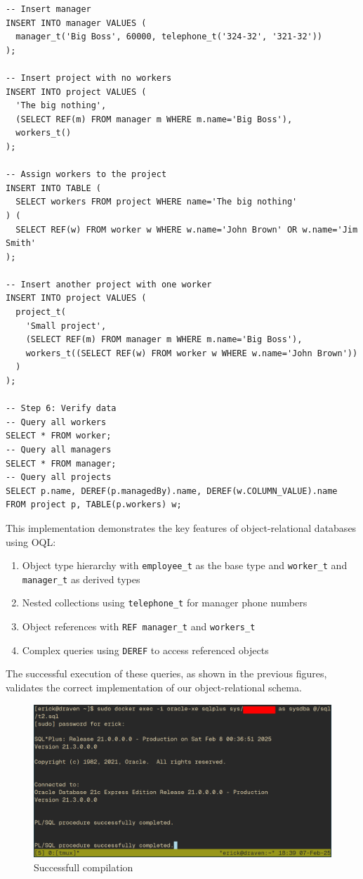\documentclass{article}
\begin{document}
\begin{verbatim}
-- Insert manager
INSERT INTO manager VALUES (
  manager_t('Big Boss', 60000, telephone_t('324-32', '321-32'))
);

-- Insert project with no workers
INSERT INTO project VALUES (
  'The big nothing',
  (SELECT REF(m) FROM manager m WHERE m.name='Big Boss'),
  workers_t()
);

-- Assign workers to the project
INSERT INTO TABLE (
  SELECT workers FROM project WHERE name='The big nothing'
) (
  SELECT REF(w) FROM worker w WHERE w.name='John Brown' OR w.name='Jim Smith'
);

-- Insert another project with one worker
INSERT INTO project VALUES (
  project_t(
    'Small project',
    (SELECT REF(m) FROM manager m WHERE m.name='Big Boss'),
    workers_t((SELECT REF(w) FROM worker w WHERE w.name='John Brown'))
  )
);

-- Step 6: Verify data
-- Query all workers
SELECT * FROM worker;
-- Query all managers
SELECT * FROM manager;
-- Query all projects
SELECT p.name, DEREF(p.managedBy).name, DEREF(w.COLUMN_VALUE).name
FROM project p, TABLE(p.workers) w;
\end{verbatim}

This implementation demonstrates the key features of object-relational databases using OQL:

\begin{enumerate}
    \item Object type hierarchy with \texttt{employee\_t} as the base type and \texttt{worker\_t} and \texttt{manager\_t} as derived types
    \item Nested collections using \texttt{telephone\_t} for manager phone numbers
    \item Object references with \texttt{REF manager\_t} and \texttt{workers\_t}
    \item Complex queries using \texttt{DEREF} to access referenced objects
\end{enumerate}

The successful execution of these queries, as shown in the previous figures, validates the correct implementation of our object-relational schema.

\begin{figure}[H]
	\centering
	\includegraphics[width=1\textwidth]{imgs/p1.png}
	\caption{Successfull compilation}
	\label{fig:20}
\end{figure}
\end{document}

